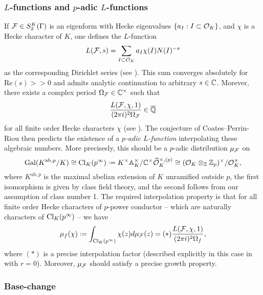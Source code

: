 \documentclass[a4paper,11pt]{article}
\numberwithin{equation}{section}
\begin{document}
\subsubsection{$L$-functions and $p$-adic $L$-functions}\label{sec:l-functions}
If $\mathcal{F} \in S_2^K(\Gamma)$ is an eigenform with Hecke eigenvalues $\{a_I : I\subset \mathcal{O}_K\}$, and $\chi$ is a Hecke character of $K$, one defines the $L$-function
\[
	L(\mathcal{F},s) = \sum_{I \subset \mathcal{O}_K}a_I \chi(I)N(I)^{-s}
\]
as the corresponding Dirichlet series (see \cite[\S1.2]{Wil17}). This sum converges absolutely for $\mathrm{Re}(s)>>0$ and admits analytic continuation to arbitrary $s\in\mathbb{C}$. Morever, there exists a complex period $\Omega_{\mathcal{F}} \in \mathbb{C}^\times$ such that
\begin{equation}\label{eqn:algebraic}
	\frac{L(\mathcal{F},\chi,1)}{(2\pi i)^2\Omega_{\mathcal{F}}} \in \overline{\mathbb{Q}}
\end{equation}
for all finite order Hecke characters $\chi$ (see \cite[\S8]{Hid94}). The conjecture of Coates--Perrin-Riou then predicts the existence of a \emph{$p$-adic $L$-function} interpolating these algebraic numbers. More precisesly, this should be a $p$-adic distribution ${\mu}_{\mathcal{F}}$ on
\[
	\mathrm{Gal}(K^{\mathrm{ab},p}/K) \cong \cl_K(p^\infty) \defeq K^\times\A_K^\times/\C^\times \widehat{\roi}_K^{\times,(p)} \cong (\roi_K\otimes_{\Z}\Zp)^\times/\roi_K^\times,
\]
where $K^{\mathrm{ab},p}$ is the maximal abelian extension of $K$ unramified outside $p$, the first isomorphism is given by class field theory, and the second follows from our assumption of class number 1. The required interpolation property is that for all finite order Hecke characters of $p$-power conductor -- which are naturally characters of $\mathrm{Cl}_K(p^\infty)$ -- we have
\begin{equation}\label{eqn:interpolation}
	\mu_f(\chi) \defeq \int_{\cl_K(p^\infty)}\chi(z)d\mu_{\f}(z) = (*)\frac{L(\f,\chi,1)}{(2\pi i)^2\Omega_{f}},
\end{equation}
where $(*)$ is a precise interpolation factor (described explicitly in this case in \cite[Thm.~3.12]{BW17} with $r=0$). Moreover, $\mu_{\mathcal{F}}$ should satisfy a precise growth property.


\subsubsection{Base-change}
\end{document}
